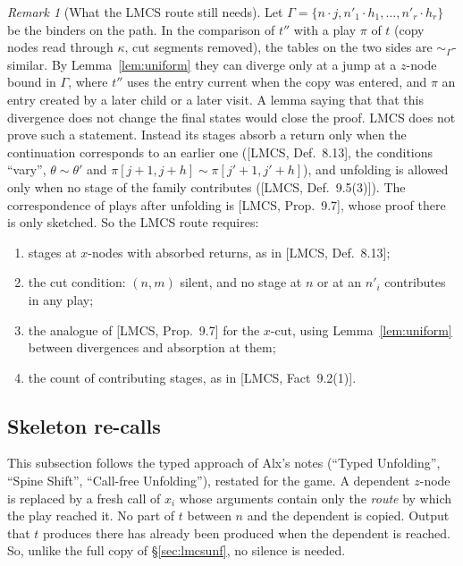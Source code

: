 \documentclass[11pt]{article}
\newcommand{\suc}[2]{#1{\cdot}#2}
\newcommand{\iv}[2]{\pi[#1,#2]}
\theoremstyle{plain}
\theoremstyle{definition}
\theoremstyle{remark}
\newtheorem{remark}[theorem]{Remark}
\begin{document}
\begin{remark}[What the LMCS route still needs]\label{rem:lmcsroute}
Let $\Gamma=\{\suc nj,\suc{n'_1}{h_1},\dots,\suc{n'_r}{h_r}\}$ be the
binders on the path.  In the comparison of $t''$ with a play $\pi$ of
$t$ (copy nodes read through $\kappa$, cut segments removed), the tables
on the two sides are $\sim_\Gamma$-similar.  By
Lemma~\ref{lem:uniform} they can diverge only at a jump at a $z$-node
bound in $\Gamma$, where $t''$ uses the entry current when the copy
was entered, and $\pi$ an entry created by a later child or a later
visit.  A lemma saying that that this divergence does not change
the final states would close the proof.  LMCS does not prove such a statement.  Instead its
stages absorb a return only when the continuation corresponds to an
earlier one ([LMCS, Def.~8.13], the conditions ``vary'', $\theta\sim\theta'$
and $\iv{j+1}{j+h}\sim\iv{j'+1}{j'+h}$), and unfolding is allowed only
when no stage of the family contributes ([LMCS, Def.~9.5(3)]).  The
correspondence of plays after unfolding is [LMCS, Prop.~9.7], whose
proof there is only sketched.  So the LMCS route requires:
\begin{enumerate}
\item stages at $x$-nodes with absorbed returns, as in [LMCS, Def.~8.13];
\item the cut condition: $(n,m)$ silent, and no stage at $n$ or at an
  $n'_i$ contributes in any play;
\item the analogue of [LMCS, Prop.~9.7] for the $x$-cut, using
  Lemma~\ref{lem:uniform} between divergences and absorption at them;
\item the count of contributing stages, as in [LMCS, Fact~9.2(1)].
\end{enumerate}
\end{remark}



\subsection{Skeleton re-calls}\label{sec:skeleton}

This subsection follows the typed approach of Alx's notes (``Typed
Unfolding'', ``Spine Shift'', ``Call-free Unfolding''), restated for
the game.  A dependent $z$-node is replaced by a fresh call of $x_i$
whose arguments contain only the \emph{route} by which the play reached
it.  No part of $t$ between $n$ and the dependent is copied.  Output that
$t$ produces there has already been produced when the dependent is
reached.  So, unlike the full copy of \S\ref{sec:lmcsunf}, no silence is
needed.
\end{document}
